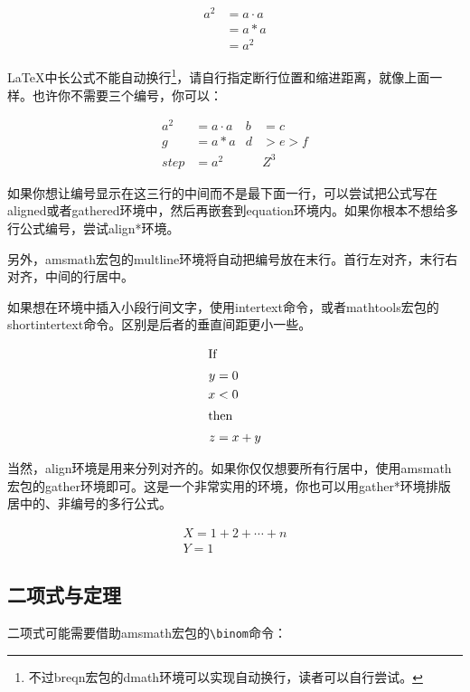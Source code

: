 {\begin{codeshow}
\begin{align}
  a^2  &= a\cdot a \\
       &= a*a      \\
       &= a^2
\end{align}
\end{codeshow}

\LaTeX 中长公式不能自动换行\footnote{不过breqn宏包的dmath环境可以实现自动换行，读者可以自行尝试。}，请自行指定断行位置和缩进距离，就像上面一样。也许你不需要三个编号，你可以：

\begin{codeshow}
\begin{align}
  a^2&= a\cdot a& b&=c\nonumber\\
  g  &= a*a & d&>e>f  \nonumber\\
  step&= a^2 & &Z^3
\end{align}
\end{codeshow}

如果你想让编号显示在这三行的中间而不是最下面一行，可以尝试把公式写在aligned或者gathered环境中，然后再嵌套到equation环境内。如果你根本不想给多行公式编号，尝试align*环境。

另外，amsmath宏包的multline环境将自动把编号放在末行。首行左对齐，末行右对齐，中间的行居中。

如果想在环境中插入小段行间文字，使用intertext命令，或者mathtools宏包的shortintertext命令。区别是后者的垂直间距更小一些。

\begin{codeshow}
\begin{align*}
\shortintertext{If}
 y &= 0 \\
 x &< 0\\
\shortintertext{then}
 z &= x+y
\end{align*}
\end{codeshow}

当然，align环境是用来分列对齐的。如果你仅仅想要所有行居中，使用amsmath宏包的gather环境即可。这是一个非常实用的环境，你也可以用gather*环境排版居中的、非编号的多行公式。

\begin{codeshow}
\begin{gather}
  X=1+2+\cdots+n \\
  Y=1
\end{gather}
\end{codeshow}

\subsection{二项式与定理}
二项式可能需要借助amsmath宏包的\verb|\binom|命令：

}
